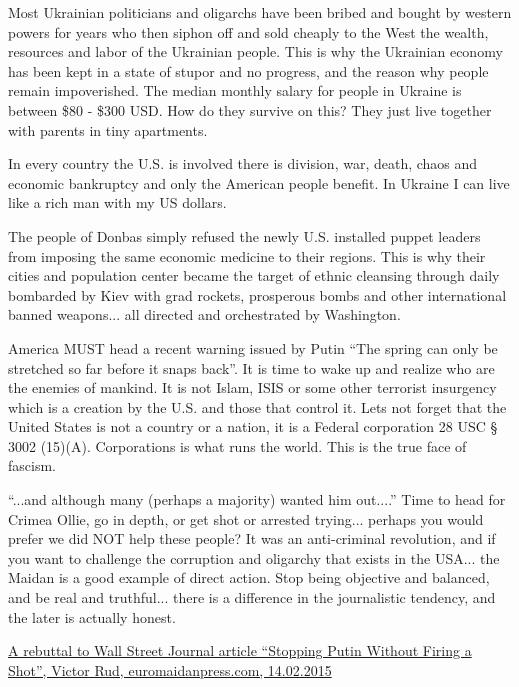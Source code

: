 \begin{itemize}
Most Ukrainian politicians and oligarchs have been bribed and bought by western
powers for years who then siphon off and sold cheaply to the West the wealth,
resources and labor of the Ukrainian people. This is why the Ukrainian economy
has been kept in a state of stupor and no progress, and the reason why people
remain impoverished. The median monthly salary for people in Ukraine is between
\$80 - \$300 USD. How do they survive on this? They just live together with
parents in tiny apartments. 

In every country the U.S. is involved there is
division, war, death, chaos and economic bankruptcy and only the American
people benefit. In Ukraine I can live like a rich man with my US dollars. 

The people of Donbas simply refused the newly U.S. installed puppet leaders
from imposing the same economic medicine to their regions. This is why their
cities and population center became the target of ethnic cleansing through
daily bombarded by Kiev with grad rockets, prosperous bombs and other
international banned weapons... all directed and orchestrated by Washington. 

America MUST head a recent warning issued by Putin \enquote{The spring can only
be stretched so far before it snaps back}. It is time to wake up and realize
who are the enemies of mankind. It is not Islam, ISIS or some other terrorist
insurgency which is a creation by the U.S. and those that control it. Lets not
forget that the United States is not a country or a nation, it is a Federal
corporation 28 USC § 3002 (15)(A). Corporations is what runs the world. This is
the true face of fascism.


\enquote{...and although many (perhaps a majority) wanted him out....} Time to head for
Crimea Ollie, go in depth, or get shot or arrested trying... perhaps you would
prefer we did NOT help these people? It was an anti-criminal revolution, and if
you want to challenge the corruption and oligarchy that exists in the USA...
the Maidan is a good example of direct action. Stop being objective and
balanced, and be real and truthful... there is a difference in the journalistic
tendency, and the later is actually honest.


\href{http://euromaidanpress.com/2015/02/14/rebuttal-wall-street-journal-article-stopping-putin-without-firing-shot/}{%
A rebuttal to Wall Street Journal article \enquote{Stopping Putin Without Firing a Shot}, %
Victor Rud, euromaidanpress.com, 14.02.2015%
}


\end{itemize}
